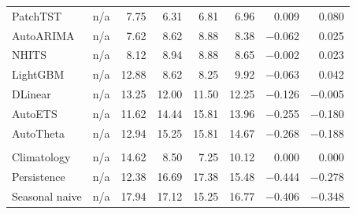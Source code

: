 \begin{table}[htbp]
\begin{tabular}{lrrrrrrr}
    PatchTST & n/a & \num{7.75} & \num{6.31} & \num{6.81} & \num{6.96} & \num{+0.009} & \num{+0.080} \\
    AutoARIMA & n/a & \num{7.62} & \num{8.62} & \num{8.88} & \num{8.38} & \num{-0.062} & \num{+0.025} \\
    NHITS & n/a & \num{8.12} & \num{8.94} & \num{8.88} & \num{8.65} & \num{-0.002} & \num{+0.023} \\
    LightGBM & n/a & \num{12.88} & \num{8.62} & \num{8.25} & \num{9.92} & \num{-0.063} & \num{+0.042} \\
    DLinear & n/a & \num{13.25} & \num{12.00} & \num{11.50} & \num{12.25} & \num{-0.126} & \num{-0.005} \\
    AutoETS & n/a & \num{11.62} & \num{14.44} & \num{15.81} & \num{13.96} & \num{-0.255} & \num{-0.180} \\
    AutoTheta & n/a & \num{12.94} & \num{15.25} & \num{15.81} & \num{14.67} & \num{-0.268} & \num{-0.188} \\
    \addlinespace
    \multicolumn{8}{l}{\emph{Naive references}} \\
    Climatology & n/a & \num{14.62} & \num{8.50} & \num{7.25} & \num{10.12} & \num{+0.000} & \num{+0.000} \\
    Persistence & n/a & \num{12.38} & \num{16.69} & \num{17.38} & \num{15.48} & \num{-0.444} & \num{-0.278} \\
    Seasonal naive & n/a & \num{17.94} & \num{17.12} & \num{15.25} & \num{16.77} & \num{-0.406} & \num{-0.348} \\
    \bottomrule
  \end{tabular}
\end{table}
